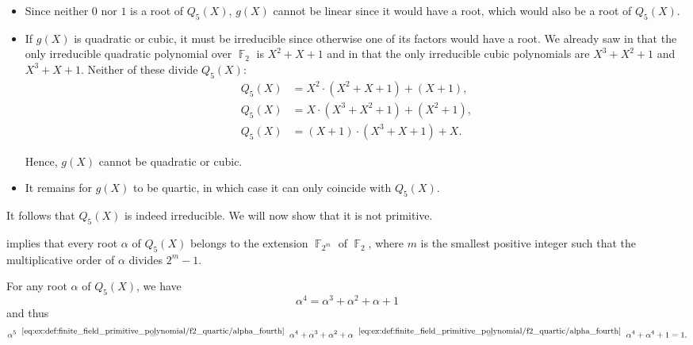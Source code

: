 \begin{example}
\begin{thmenum}
    \begin{itemize}
      \item Since neither \( 0 \) nor \( 1 \) is a root of \( Q_5(X) \), \( g(X) \) cannot be linear since it would have a root, which would also be a root of \( Q_5(X) \).

      \item If \( g(X) \) is quadratic or cubic, it must be irreducible since otherwise one of its factors would have a root. We already saw in  that the only irreducible quadratic polynomial over \( \BbbF_2 \) is \( X^2 + X + 1 \) and in  that the only irreducible cubic polynomials are \( X^3 + X^2 + 1 \) and \( X^3 + X + 1 \). Neither of these divide \( Q_5(X) \):
      \begin{align*}
        Q_5(X) &= X^2 \cdot (X^2 + X + 1) + (X + 1), \\
        Q_5(X) &= X \cdot (X^3 + X^2 + 1) + (X^2 + 1), \\
        Q_5(X) &= (X + 1) \cdot (X^3 + X + 1) + X.
      \end{align*}

      Hence, \( g(X) \) cannot be quadratic or cubic.

      \item It remains for \( g(X) \) to be quartic, in which case it can only coincide with \( Q_5(X) \).
    \end{itemize}

    It follows that \( Q_5(X) \) is indeed irreducible. We will now show that it is not primitive.

     implies that every root \( \alpha \) of \( Q_5(X) \) belongs to the extension \( \BbbF_{2^m} \) of \( \BbbF_2 \), where \( m \) is the smallest positive integer such that the multiplicative order of \( \alpha \) divides \( 2^m - 1 \).

    For any root \( \alpha \) of \( Q_5(X) \), we have
    \begin{equation}\label{eq:ex:def:finite_field_primitive_polynomial/f2_quartic/alpha_fourth}
      \alpha^4 = \alpha^3 + \alpha^2 + \alpha + 1
    \end{equation}
    and thus
    \begin{equation*}
      \alpha^5
      \reloset{\eqref{eq:ex:def:finite_field_primitive_polynomial/f2_quartic/alpha_fourth}} =
      \alpha^4 + \alpha^3 + \alpha^2 + \alpha
      \reloset{\eqref{eq:ex:def:finite_field_primitive_polynomial/f2_quartic/alpha_fourth}} =
      \alpha^4 + \alpha^4 + 1
      =
      1.
    \end{equation*}


\end{thmenum}
\end{example}
